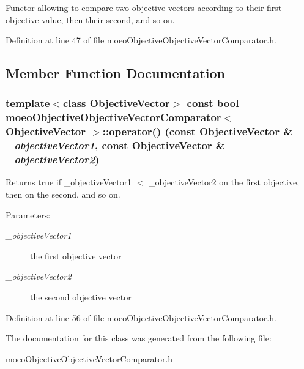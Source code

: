 Functor allowing to compare two objective vectors according to their first objective value, then their second, and so on. 



Definition at line 47 of file moeo\-Objective\-Objective\-Vector\-Comparator.h.

\subsection{Member Function Documentation}
\subsubsection{\setlength{\rightskip}{0pt plus 5cm}template$<$class Objective\-Vector$>$ const bool \bf{moeo\-Objective\-Objective\-Vector\-Comparator}$<$ \bf{Objective\-Vector} $>$::operator() (const \bf{Objective\-Vector} \& {\em \_\-objective\-Vector1}, const \bf{Objective\-Vector} \& {\em \_\-objective\-Vector2})\hspace{0.3cm}{\tt  [inline]}}\label{classmoeoObjectiveObjectiveVectorComparator_bc3c97b380e87107e92f52843a7f9303}


Returns true if \_\-objective\-Vector1 $<$ \_\-objective\-Vector2 on the first objective, then on the second, and so on. 

\begin{Desc}
\item[Parameters:]
\begin{description}
\item[{\em \_\-objective\-Vector1}]the first objective vector \item[{\em \_\-objective\-Vector2}]the second objective vector \end{description}
\end{Desc}


Definition at line 56 of file moeo\-Objective\-Objective\-Vector\-Comparator.h.

The documentation for this class was generated from the following file:\begin{CompactItemize}
\item 
moeo\-Objective\-Objective\-Vector\-Comparator.h\end{CompactItemize}
